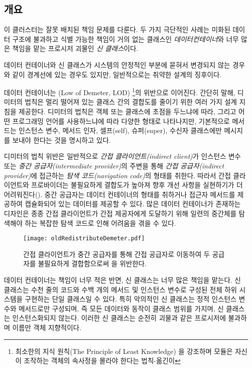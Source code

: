 \documentclass[a4paper,10pt,twoside]{book}
\begin{document}
\subsection*{개요}

이 클러스터는 잘못 배치된 책임 문제를 다룬다. 두 가지 극단적인 사례는 미화된 데이터 구조에 불과하고 식별 가능한 책임이 거의 없는 클래스인 \emph{데이터컨테이너}와 너무 많은 책임을 맡는 프로시저 괴물인 \emph{신 클래스}이다.

데이터 컨테이너와 신 클래스가 시스템의 안정적인 부분에 묻혀서 변경되지 않는 경우와 같이 경계선에 있는 경우도 있지만, 일반적으로는 취약한 설계의 징후이다.

데이터 컨테이너는 (Low of Demeter, LOD) \cite{Lieb88a}\footnote{최소한의 지식 원칙(The Principle of Least Knowledge) 을 강조하며 모듈은 자신이 조작하는 객체의 속사정을 몰라야 한다는 법칙-옮긴이}의 위반으로 이어진다. 간단히 말해, 디미터의 법칙은 멀리 떨어져 있는 클래스 간의 결합도를 줄이기 위한 여러 가지 설계 지침을 제공한다. 디미터의 법칙은 객체 또는 클래스에 초점을 두느냐에 따라, 그리고 어떤 프로그래밍 언어를 사용하느냐에 따라 다양한 형태로 나타나지만, 기본적으로 메서드는 인스턴스 변수, 메서드 인자, 셀프(self), 슈퍼(super), 수신자 클래스에만 메시지를 보내야 한다는 것을 명시하고 있다.

디미터의 법칙 위반은 일반적으로 \emph{간접 클라이언트(indirect client)}가 인스턴스 변수 또는 \emph{중간 공급자(intermediate provider)}의 주변을 통해 \emph{간접 공급자(indirect provider)}에 접근하는 \emph{탐색 코드(navigation code)}의 형태를 취한다. 따라서 간접 클라이언트와 프로바이더는 불필요하게 결합도가 높아져 향후 개선 사항을 실현하기가 더 어려워진다(). 중간 공급자는 데이터 컨테이너의 형태를 취하거나 접근자 메서드를 제공하여 캡슐화되어 있는 데이터를 제공할 수 있다. 많은 데이터 컨테이너가 존재하는 디자인은 종종 간접 클라이언트가 간접 제공자에게 도달하기 위해 일련의 중간체를 탐색해야 하는 복잡한 탐색 코드로 인해 어려움을 겪을 수 있다.

\begin{figure}[h]
\begin{center}
\texttt{[image: oldRedistributeDemeter.pdf]}
\caption{간접 클라이언트가 중간 공급자를 통해 간접 공급자로 이동하여 두 공급자를 불필요하게 결합함으로써 을 위반한다.}
\end{center}
\end{figure}

데이터 컨테이너는 책임이 너무 적은 반면, 신 클래스는 너무 많은 책임을 맡는다. 신 클래스는 수천 줄의 코드와 수백 개의 메서드 및 인스턴스 변수로 구성된 전체 하위 시스템을 구현하는 단일 클래스일 수 있다. 특히 악의적인 신 클래스는 정적 인스턴스 변수와 메서드로만 구성되며, 즉 모든 데이터와 동작이 클래스 범위를 가지며, 신 클래스는 인스턴스화되지 않는다. 이러한 신 클래스는 순전히 괴물과 같은 프로시저에 불과하며 이름만 객체 지향적이다. 
\end{document}
